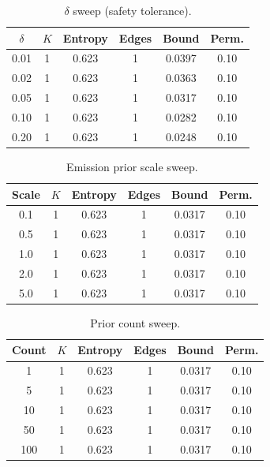 \documentclass[11pt]{article}
\begin{document}
\begin{table}[h]
\centering
\caption{$\delta$ sweep (safety tolerance).}\label{tab:deltasweep}
\small
\begin{tabular}{@{}cccccc@{}}
\toprule
$\delta$ & $K$ & Entropy & Edges & Bound
  & Perm. \\
\midrule
0.01 & 1 & 0.623 & 1 & 0.0397 & 0.10 \\
0.02 & 1 & 0.623 & 1 & 0.0363 & 0.10 \\
0.05 & 1 & 0.623 & 1 & 0.0317 & 0.10 \\
0.10 & 1 & 0.623 & 1 & 0.0282 & 0.10 \\
0.20 & 1 & 0.623 & 1 & 0.0248 & 0.10 \\
\bottomrule
\end{tabular}
\end{table}

\begin{table}[h]
\centering
\caption{Emission prior scale sweep.}\label{tab:emissionsweep}
\small
\begin{tabular}{@{}cccccc@{}}
\toprule
Scale & $K$ & Entropy & Edges & Bound & Perm. \\
\midrule
0.1 & 1 & 0.623 & 1 & 0.0317 & 0.10 \\
0.5 & 1 & 0.623 & 1 & 0.0317 & 0.10 \\
1.0 & 1 & 0.623 & 1 & 0.0317 & 0.10 \\
2.0 & 1 & 0.623 & 1 & 0.0317 & 0.10 \\
5.0 & 1 & 0.623 & 1 & 0.0317 & 0.10 \\
\bottomrule
\end{tabular}
\end{table}

\begin{table}[h]
\centering
\caption{Prior count sweep.}\label{tab:priorsweep}
\small
\begin{tabular}{@{}cccccc@{}}
\toprule
Count & $K$ & Entropy & Edges & Bound & Perm. \\
\midrule
1   & 1 & 0.623 & 1 & 0.0317 & 0.10 \\
5   & 1 & 0.623 & 1 & 0.0317 & 0.10 \\
10  & 1 & 0.623 & 1 & 0.0317 & 0.10 \\
50  & 1 & 0.623 & 1 & 0.0317 & 0.10 \\
100 & 1 & 0.623 & 1 & 0.0317 & 0.10 \\
\bottomrule
\end{tabular}
\end{table}
\end{document}
